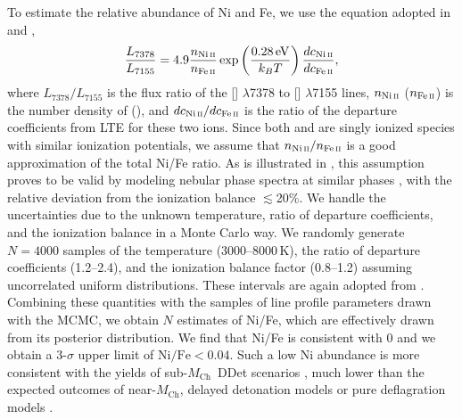 \documentclass[twocolumn]{aastex631}
\newcommand{\Mch}{$M_\mathrm{Ch}$}
\begin{document}
\begin{CJK*}{UTF8}{gbsn}
To estimate the relative abundance of Ni and Fe, we use the equation adopted in \citet{Jerkstrand_2015} and \citet{Maguire_2018},
\begin{equation}
    \frac{L_{7378}}{L_{7155}} = 4.9\frac{n_{\mathrm{Ni}\,\textsc{ii}}}{n_{\mathrm{Fe}\,\textsc{ii}}}\exp\left(\frac{0.28\,\mathrm
    {eV}}{k_BT}\right)\frac{dc_{\mathrm{Ni}\,\textsc{ii}}}{dc_{\mathrm{Fe}\,\textsc{ii}}},
\end{equation}
where $L_{7378}/L_{7155}$ is the flux ratio of the [] $\lambda$7378 to [] $\lambda$7155 lines, $n_{\mathrm{Ni}\,\textsc{ii}}$ ($n_{\mathrm{Fe}\,\textsc{ii}}$) is the number density of  (), and ${dc_{\mathrm{Ni}\,\textsc{ii}}}/{dc_{\mathrm{Fe}\,\textsc{ii}}}$ is the ratio of the departure coefficients from LTE for these two ions. Since both  and  are singly ionized species with similar ionization potentials, we assume that $n_{\mathrm{Ni}\,\textsc{ii}}/n_{\mathrm{Fe}\,\textsc{ii}}$ is a good approximation of the total Ni/Fe ratio. As is illustrated in \citet{Maguire_2018}, this assumption proves to be valid by modeling nebular phase spectra at similar phases \citep{Fransson_2015,Shingles_2022}, with the relative deviation from the ionization balance $\lesssim$20\%. We handle the uncertainties due to the unknown temperature, ratio of departure coefficients, and the ionization balance in a Monte Carlo way. We randomly generate $N=4000$ samples of the temperature (3000--8000\,K), the ratio of departure coefficients (1.2--2.4), and the ionization balance factor (0.8--1.2) assuming uncorrelated uniform distributions. These intervals are again adopted from \citet{Maguire_2018}. Combining these quantities with the samples of line profile parameters drawn with the MCMC, we obtain $N$ estimates of Ni/Fe, which are effectively drawn from its posterior distribution. We find that Ni/Fe is consistent with 0 and we obtain a 3-$\sigma$ upper limit of $\mathrm{Ni/Fe}<0.04$. Such a low Ni abundance is more consistent with the yields of sub-\Mch\ DDet scenarios \citep{Shen_DD_2018}, much lower than the expected outcomes of near-\Mch, delayed detonation models \citep{Seitenzahl_2013} or pure deflagration models \citep{Iwamoto_1999}.


\end{CJK*}
\end{document}
